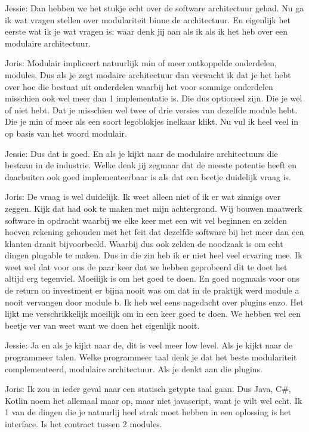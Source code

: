 Jessie: Dan hebben we het stukje echt over de software architectuur gehad. Nu ga ik wat vragen stellen over modulariteit binne de architectuur. En eigenlijk het eerste wat ik je wat vragen is: waar denk jij aan als ik als ik het heb over een modulaire architectuur.

Joris: Modulair impliceert natuurlijk min of meer ontkoppelde onderdelen, modules. Dus als je zegt modaire architectuur dan verwacht ik dat je het hebt over hoe die bestaat uit onderdelen waarbij het voor sommige onderdelen misschien ook wel meer dan 1 implementatie is. Die dus optioneel zijn. Die je wel of niet hebt. Dat je misschien wel twee of drie versies van dezelfde module hebt. Die je min of meer als een soort legoblokjes inelkaar klikt. Nu vul ik heel veel in op basis van het woord modulair.

Jessie: Dus dat is goed. En als je kijkt naar de modulaire architectuurs die bestaan in de industrie. Welke denk jij zegmaar dat de meeste potentie heeft en daarbuiten ook goed implementeerbaar is als dat een beetje duidelijk vraag is.

Joris: De vraag is wel duidelijk. Ik weet alleen niet of ik er wat zinnigs over zeggen. Kijk dat had ook te maken met mijn achtergrond. Wij bouwen maatwerk software in opdracht waarbij we elke keer met een wit vel beginnen en zelden hoeven rekening gehouden met het feit dat dezelfde software bij het meer dan een klanten draait bijvoorbeeld. Waarbij dus ook zelden de noodzaak is om echt dingen plugable te maken. Dus in die zin heb ik er niet heel veel ervaring mee. Ik weet wel dat voor ons de paar keer dat we hebben geprobeerd dit te doet het altijd erg tegenviel. Moeilijk is om het goed te doen. En goed nogmaals voor ons de return on investment er bijna nooit was om dat in de praktijk werd module a nooit vervangen door module b. Ik heb wel eens nagedacht over plugins enzo. Het lijkt me verschrikkelijk moeilijk om in een keer goed te doen. We hebben wel een beetje ver van weet want we doen het eigenlijk nooit.

Jessie: Ja en als je kijkt naar de, dit is veel meer low level. Als je kijkt naar de programmeer talen. Welke programmeer taal denk je dat het beste modulariteit complementeerd, modulaire architectuur. Als je denkt aan die plugins.

Joris: Ik zou in ieder geval naar een statisch getypte taal gaan. Dus Java, C\#, Kotlin noem het allemaal maar op, maar niet javascript, want je wilt wel echt. Ik 1 van de dingen die je natuurlij heel strak moet hebben in een oplossing is het interface. Is het contract tussen 2 modules.

